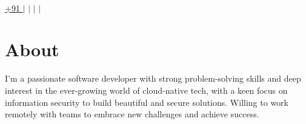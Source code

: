 \documentclass[letterpaper,12pt]{article}
\begin{document}
\begin{center}
  \textbf{\Huge \scshape \myName} \\ \vspace{5pt}
  \small
  {\expandafter\href\expandafter{tel:+91\myPhoneNumber}{\underline{+91 \myPhoneNumber}}} $|$
  {\expandafter\href\expandafter{mailto:\myEmail}{\underline{\myEmail}}} $|$
  {\expandafter\href\expandafter{https://\myWebsite}{\underline{\myWebsite}}} $|$
  {\expandafter\href\expandafter{https://\myGithub}{\underline{\myGithub}}} $|$
  {\expandafter\href\expandafter{https://www.timeanddate.com/time/zone/india/\myCityTzSlug}{\underline{\myLocation}}}
\end{center}


\section{About}
\begin{adjustwidth}{8pt}{4pt}
  \hspace{35pt}
  \small{I'm a passionate software developer with strong problem-solving skills and deep interest in the ever-growing world of cloud-native tech, with a keen focus on information security to build beautiful and secure solutions. Willing to work remotely with teams to embrace new challenges and achieve success.}
\end{adjustwidth}
\end{document}
